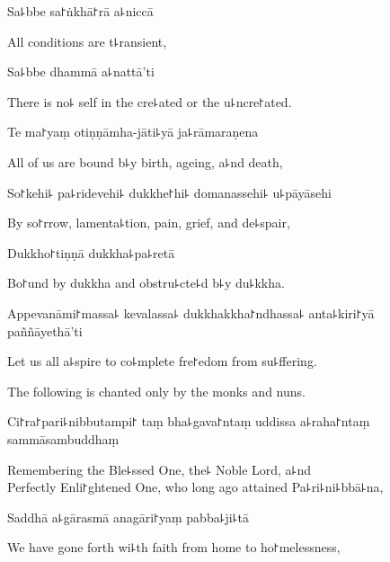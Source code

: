 Sa꜕bbe sa꜓ṅkhā꜓rā a꜕niccā

\begin{english}
  All conditions are t꜕ransient,
\end{english}

Sa꜕bbe dhammā a꜕nattā'ti

\begin{english}
  There is no꜕ self in the cre꜕ated or the u꜕ncre꜓ated.
\end{english}

Te ma꜓yaṃ otiṇṇāmha-jāti꜕yā ja꜕rāmaraṇena

\begin{english}
  All of us are bound b꜕y birth, ageing, a꜕nd death,
\end{english}

So꜓kehi꜕ pa꜕ridevehi꜕ dukkhe꜓hi꜕ domanassehi꜕ u꜕pāyāsehi

\begin{english}
  By so꜓rrow, lamenta꜕tion, pain, grief, and de꜕spair,
\end{english}

Dukkho꜓tiṇṇā dukkha꜕pa꜕retā

\begin{english}
  Bo꜓und by dukkha and obstru꜕cte꜕d b꜕y du꜕kkha.
\end{english}

Appevanāmi꜓massa꜕ kevalassa꜕ dukkhakkha꜓ndhassa꜕ anta꜕kiri꜓yā \\paññāyethā'ti

\begin{english}
  Let us all a꜕spire to co꜕mplete fre꜓edom from su꜕ffering.
\end{english}

\begin{instruction}
  The following is chanted only by the monks and nuns.
\end{instruction}

Ci꜓ra꜓pari꜕nibbutampi꜓ taṃ bha꜕gava꜓ntaṃ uddissa a꜕raha꜓ntaṃ sammāsambuddhaṃ

\begin{english}
  Remembering the Ble꜕ssed One, the꜕ Noble Lord, a꜕nd \\Perfectly Enli꜓ghtened One, who long ago attained Pa꜕ri꜕ni꜕bbā꜕na,
\end{english}

Saddhā a꜕gārasmā anagāri꜓yaṃ pabba꜕ji꜕tā

\begin{english}
  We have gone forth wi꜕th faith from home to ho꜓melessness,
\end{english}

